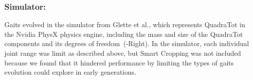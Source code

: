 
\subsubsection{Simulator:}
Gaits evolved in the simulator from Glette et al.\footnotemark[\value{footnote}], which represents QuadraTot in the Nvidia PhysX physics engine, including the mass and size of the QuadraTot components and its degrees of freedom~(-Right). In the simulator, each individual joint range was limit as described above, but Smart Cropping was not included because we found that it hindered performance by limiting the types of gaits evolution could explore in early generations. 


